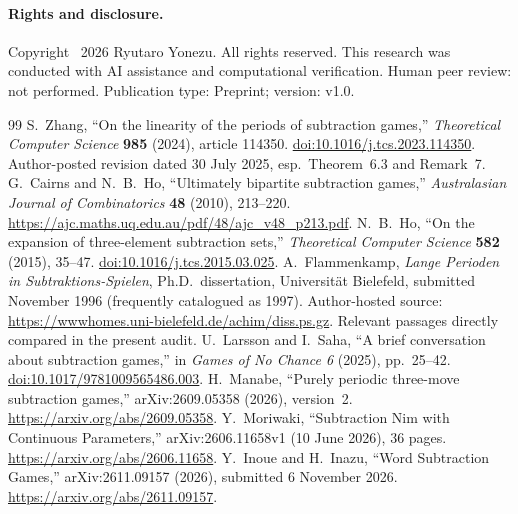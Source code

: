 \documentclass[10pt,a4paper]{article}
\begin{document}
\paragraph{Rights and disclosure.} Copyright \textcopyright\ 2026 Ryutaro Yonezu. All rights reserved. This research was conducted with AI assistance and computational verification. Human peer review: not performed. Publication type: Preprint; version: v1.0.

\begingroup\small
\begin{thebibliography}{99}\setlength{\itemsep}{2pt}
 S.~Zhang, ``On the linearity of the periods of subtraction games,'' \emph{Theoretical Computer Science} \textbf{985} (2024), article 114350. \href{https://doi.org/10.1016/j.tcs.2023.114350}{doi:10.1016/j.tcs.2023.114350}. Author-posted revision dated 30 July 2025, esp.~Theorem~6.3 and Remark~7.
 G.~Cairns and N.~B.~Ho, ``Ultimately bipartite subtraction games,'' \emph{Australasian Journal of Combinatorics} \textbf{48} (2010), 213--220. \url{https://ajc.maths.uq.edu.au/pdf/48/ajc_v48_p213.pdf}.
 N.~B.~Ho, ``On the expansion of three-element subtraction sets,'' \emph{Theoretical Computer Science} \textbf{582} (2015), 35--47. \href{https://doi.org/10.1016/j.tcs.2015.03.025}{doi:10.1016/j.tcs.2015.03.025}.
 A.~Flammenkamp, \emph{Lange Perioden in Subtraktions-Spielen}, Ph.D.~dissertation, Universit\"at Bielefeld, submitted November 1996 (frequently catalogued as 1997). Author-hosted source: \url{https://wwwhomes.uni-bielefeld.de/achim/diss.ps.gz}. Relevant passages directly compared in the present audit.
 U.~Larsson and I.~Saha, ``A brief conversation about subtraction games,'' in \emph{Games of No Chance 6} (2025), pp.~25--42. \href{https://doi.org/10.1017/9781009565486.003}{doi:10.1017/9781009565486.003}.
 H.~Manabe, ``Purely periodic three-move subtraction games,'' arXiv:2609.05358 (2026), version~2. \url{https://arxiv.org/abs/2609.05358}.
 Y.~Moriwaki, ``Subtraction Nim with Continuous Parameters,'' arXiv:2606.11658v1 (10 June 2026), 36 pages. \url{https://arxiv.org/abs/2606.11658}.
 Y.~Inoue and H.~Inazu, ``Word Subtraction Games,'' arXiv:2611.09157 (2026), submitted 6 November 2026. \url{https://arxiv.org/abs/2611.09157}.
\end{thebibliography}\endgroup
\end{document}
